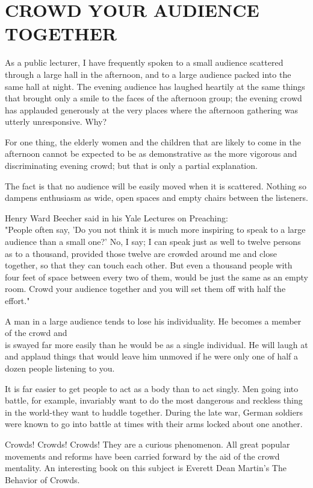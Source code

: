 \documentclass[10pt]{article}
\begin{document}
\section*{CROWD YOUR AUDIENCE TOGETHER}
As a public lecturer, I have frequently spoken to a small audience scattered through a large hall in the afternoon, and to a large audience packed into the same hall at night. The evening audience has laughed heartily at the same things that brought only a smile to the faces of the afternoon group; the evening crowd has applauded generously at the very places where the afternoon gathering was utterly unresponsive. Why?

For one thing, the elderly women and the children that are likely to come in the afternoon cannot be expected to be as demonstrative as the more vigorous and discriminating evening crowd; but that is only a partial explanation.

The fact is that no audience will be easily moved when it is scattered. Nothing so dampens enthusiasm as wide, open spaces and empty chairs between the listeners.

Henry Ward Beecher said in his Yale Lectures on Preaching:\\
"People often say, 'Do you not think it is much more inspiring to speak to a large audience than a small one?' No, I say; I can speak just as well to twelve persons as to a thousand, provided those twelve are crowded around me and close together, so that they can touch each other. But even a thousand people with four feet of space between every two of them, would be just the same as an empty room. Crowd your audience together and you will set them off with half the effort."

A man in a large audience tends to lose his individuality. He becomes a member of the crowd and\\
is swayed far more easily than he would be as a single individual. He will laugh at and applaud things that would leave him unmoved if he were only one of half a dozen people listening to you.

It is far easier to get people to act as a body than to act singly. Men going into battle, for example, invariably want to do the most dangerous and reckless thing in the world-they want to huddle together. During the late war, German soldiers were known to go into battle at times with their arms locked about one another.

Crowds! Crowds! Crowds! They are a curious phenomenon. All great popular movements and reforms have been carried forward by the aid of the crowd mentality. An interesting book on this subject is Everett Dean Martin's The Behavior of Crowds.
\end{document}
